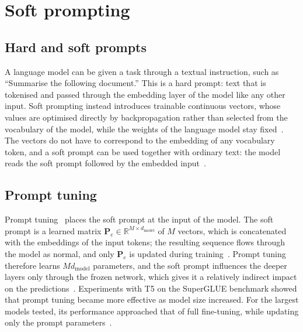 \section{Soft prompting}
\label{sec:soft-prompting}

\subsection{Hard and soft prompts}
\label{sec:soft-prompts}

A language model can be given a task through a textual instruction, such as ``Summarise the following document.'' This is a hard prompt: text that is tokenised and passed through the embedding layer of the model like any other input. Soft prompting instead introduces trainable continuous vectors, whose values are optimised directly by backpropagation rather than selected from the vocabulary of the model, while the weights of the language model stay fixed~\cite{lester2021power}. The vectors do not have to correspond to the embedding of any vocabulary token, and a soft prompt can be used together with ordinary text: the model reads the soft prompt followed by the embedded input~\cite{lester2021power}.

\subsection{Prompt tuning}
\label{sec:prompt-tuning}

Prompt tuning~\cite{lester2021power} places the soft prompt at the input of the model. The soft prompt is a learned matrix $\mathbf{P}_e \in \mathbb{R}^{M \times d_{\text{model}}}$ of $M$ vectors, which is concatenated with the embeddings of the input tokens; the resulting sequence flows through the model as normal, and only $\mathbf{P}_e$ is updated during training~\cite{lester2021power}. Prompt tuning therefore learns $M d_{\text{model}}$ parameters, and the soft prompt influences the deeper layers only through the frozen network, which gives it a relatively indirect impact on the predictions~\cite{liu2022ptuning}. Experiments with T5 on the SuperGLUE benchmark showed that prompt tuning became more effective as model size increased. For the largest models tested, its performance approached that of full fine-tuning, while updating only the prompt parameters~\cite{lester2021power}.

